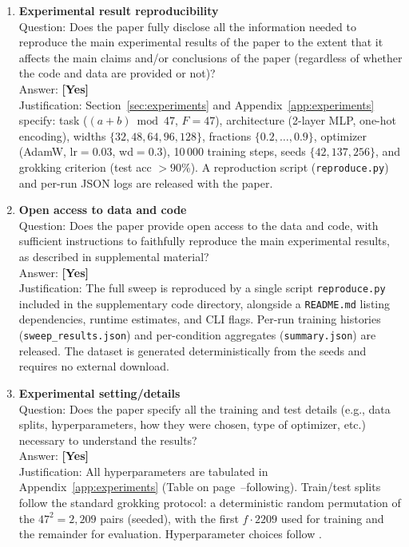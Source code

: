 \documentclass{article}
\newcommand{\Fnum}{F}
\begin{document}
\begin{enumerate}
\item {\bf Experimental result reproducibility}\\
Question: Does the paper fully disclose all the information needed to reproduce the main experimental results of the paper to the extent that it affects the main claims and/or conclusions of the paper (regardless of whether the code and data are provided or not)?\\
Answer: \textbf{[Yes]}\\
Justification: Section~\ref{sec:experiments} and Appendix~\ref{app:experiments} specify: task ($(a+b)\bmod 47$, $\Fnum=47$), architecture (2-layer MLP, one-hot encoding), widths $\{32,48,64,96,128\}$, fractions $\{0.2,\ldots,0.9\}$, optimizer (AdamW, lr$=0.03$, wd$=0.3$), 10\,000 training steps, seeds $\{42, 137, 256\}$, and grokking criterion (test acc $> 90\%$). A reproduction script (\texttt{reproduce.py}) and per-run JSON logs are released with the paper.

\item {\bf Open access to data and code}\\
Question: Does the paper provide open access to the data and code, with sufficient instructions to faithfully reproduce the main experimental results, as described in supplemental material?\\
Answer: \textbf{[Yes]}\\
Justification: The full sweep is reproduced by a single script \texttt{reproduce.py} included in the supplementary code directory, alongside a \texttt{README.md} listing dependencies, runtime estimates, and CLI flags. Per-run training histories (\texttt{sweep\_results.json}) and per-condition aggregates (\texttt{summary.json}) are released. The dataset is generated deterministically from the seeds and requires no external download.

\item {\bf Experimental setting/details}\\
Question: Does the paper specify all the training and test details (e.g., data splits, hyperparameters, how they were chosen, type of optimizer, etc.) necessary to understand the results?\\
Answer: \textbf{[Yes]}\\
Justification: All hyperparameters are tabulated in Appendix~\ref{app:experiments} (Table on page~\pageref{tab:full_results}--following). Train/test splits follow the standard grokking protocol: a deterministic random permutation of the $47^2 = 2{,}209$ pairs (seeded), with the first $f \cdot 2209$ used for training and the remainder for evaluation. Hyperparameter choices follow \citet{nanda2023progress}.


\end{enumerate}
\end{document}

